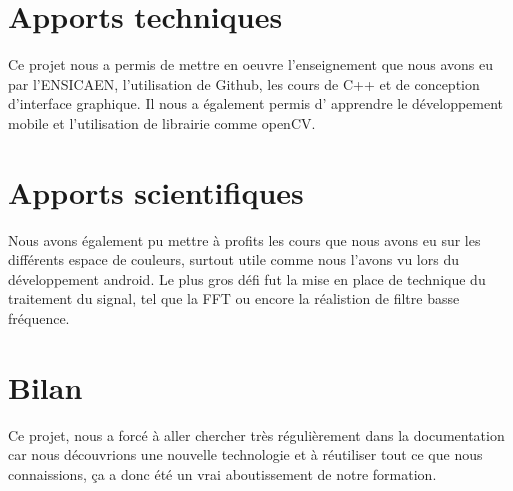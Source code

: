 \section{Apports techniques}

Ce projet nous a permis de mettre en oeuvre l'enseignement que nous avons eu par l'ENSICAEN, l'utilisation de Github, les cours de C++ et de conception d'interface graphique. Il nous a également permis d'
apprendre le développement mobile et l'utilisation de librairie comme openCV. 

\section{Apports scientifiques}

Nous avons également pu mettre à profits les cours que nous avons eu sur les différents espace de couleurs, surtout utile comme nous l'avons vu lors du développement android. Le plus gros défi fut la mise
en place de technique du traitement du signal, tel que la FFT ou encore la réalistion de filtre basse fréquence. 

\section{Bilan}

Ce projet, nous a forcé à aller chercher très régulièrement dans la documentation car nous découvrions une nouvelle technologie et à réutiliser tout ce que nous connaissions, ça a donc été un vrai 
aboutissement de notre formation.
